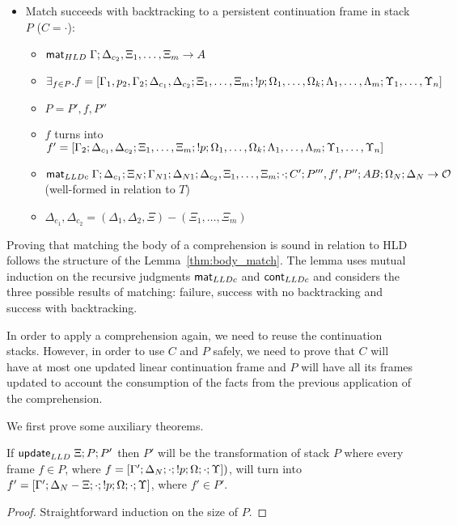 \begin{lemma}
\begin{itemize}[leftmargin=*]
   \item Match succeeds with backtracking to a persistent continuation frame
   in stack $P$ ($C = \cdot$):
   \begin{itemize}[leftmargin=\secondm]
      \item $\mathsf{mat}_{HLD} \; \Gamma; \Delta_{c_2}, \Xi_1, \dotsc, \Xi_m \rightarrow A$
      \item $\exists_{f \in P}. f = [\Gamma_1, p_2, \Gamma_2; \Delta_{c_1}, \Delta_{c_2};
   \Xi_1, \dotsc, \Xi_m; {!} p; \Omega_1, \dotsc, \Omega_k; \Lambda_1,
   \dotsc, \Lambda_m; \Upsilon_1, \dotsc, \Upsilon_n]$
      \item $P = P', f, P''$
      \item $f$ turns into $f' = [\Gamma_2; \Delta_{c_1},
         \Delta_{c_2}; \Xi_1, \dotsc, \Xi_m; {!} p; \Omega_1, \dotsc,
         \Omega_k; \Lambda_1, \dotsc, \Lambda_m; \Upsilon_1, \dotsc, \Upsilon_n]$
      \item $\mathsf{mat}_{LLDc} \; \Gamma; \Delta_{c_1}; \Xi_N; \Gamma_{N1}; \Delta_{N1};
      \Delta_{c_2}, \Xi_1, \dotsc, \Xi_m; \cdot; C'; P''', f', P'';
      AB; \Omega_N; \Delta_N \rightarrow \mathcal{O}$
      (well-formed in relation to $T$)
      \item $\Delta_{c_1}, \Delta_{c_2} = (\Delta_1, \Delta_2, \Xi) - (\Xi_1, \dotsc,
            \Xi_m)$
   \end{itemize}
   
\end{itemize}
\end{lemma}

Proving that matching the body of a comprehension is sound in relation to HLD
follows the structure of the Lemma~\ref{thm:body_match}. The lemma uses mutual
induction on the recursive judgments $\mathsf{mat}_{LLDc} \;$and $\mathsf{cont}_{LLDc} \;$and considers the three
possible results of matching: failure, success with no backtracking and success
with backtracking.

In order to apply a comprehension again, we need to reuse the continuation
stacks. However, in order to use $C$ and $P$ safely, we need to prove that $C$
will have at most one updated linear continuation frame and $P$ will have all
its frames updated to account the consumption of the facts from the previous
application of the comprehension.

We first prove some auxiliary theorems.

\begin{theorem}\label{thm:stack_update}
If $\mathsf{update}_{LLD} \; \Xi; P; P'$ then $P'$ will be the transformation of stack $P$ where
every frame $f \in P$, where $f = [\Gamma'; \Delta_N; \cdot; {!} p; \Omega; \cdot;
      \Upsilon])$, will turn into $f' = [\Gamma'; \Delta_N - \Xi; \cdot;
      {!} p; \Omega; \cdot; \Upsilon]$, where $f' \in P'$.
\end{theorem}
\begin{proof}
Straightforward induction on the size of $P$.
\end{proof}

